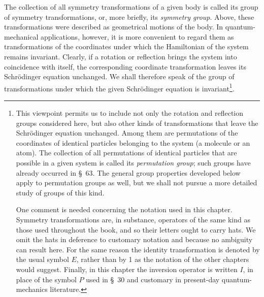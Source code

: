 The collection of all symmetry transformations of a given body is called its 
group of symmetry transformations, or, more briefly, its \emph{symmetry 
group}.  Above, these transformations were described as geometrical motions 
of the body.  In quantum-mechanical applications, however, it is more 
convenient to regard them as transformations of the coordinates under which 
the Hamiltonian of the system remains invariant.  Clearly, if a rotation or 
reflection brings the system into coincidence with itself, the corresponding 
coordinate transformation leaves its Schr\"odinger equation unchanged.  We 
shall therefore speak of the group of transformations under which the given 
Schr\"odinger equation is invariant\footnote{This viewpoint permits us to 
include not only the rotation and reflection groups considered here, but also 
other kinds of transformations that leave the Schr\"odinger equation 
unchanged.  Among them are permutations of the coordinates of identical 
particles belonging to the system (a molecule or an atom).  The collection of 
all permutations of identical particles that are possible in a given system 
is called its \emph{permutation group}; such groups have already occurred in 
\S~63.  The general group properties developed below apply to permutation 
groups as well, but we shall not pursue a more detailed study of groups of 
this kind.

One comment is needed concerning the notation used in this chapter.  Symmetry 
transformations are, in substance, operators of the same kind as those used 
throughout the book, and so their letters ought to carry hats.  We omit the 
hats in deference to customary notation and because no ambiguity can result 
here.  For the same reason the identity transformation is denoted by the 
usual symbol $E$, rather than by 1 as the notation of the other chapters would 
suggest.  Finally, in this chapter the inversion operator is written $I$, in 
place of the symbol $P$ used in \S~30 and customary in present-day quantum-
mechanics literature.}.
